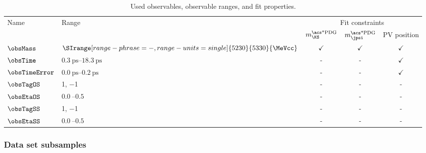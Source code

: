 \begin{table}
\centering
\caption{Used observables, observable ranges, and \DTF fit properties.}
\label{tab:measurement_of_sin2beta:data_preparation:observables}
\begin{tabular}{llccc}
\toprule
Name              & Range           & \multicolumn{3}{c}{Fit constraints} \\ 
                  &                 & $m_{\KS}^{\text{\acs*{PDG}}}$ & $m_{\jpsi}^{\text{\acs*{PDG}}}$ & \acs{PV} position \\
\midrule    
$\obsMass$        & $\SIrange[range-phrase = -, range-units = single]{5230}{5330}{\MeVcc}$      & $\checkmark$ & $\checkmark$ & $\checkmark$ \\
$\obsTime$        & $\SIrange[range-phrase = -, range-units = single]{0.3}{18.3}{\pico\second}$ & -            & -            & $\checkmark$ \\
$\obsTimeError$   & $\SIrange[range-phrase = -, range-units = single]{0.0}{0.2}{\pico\second}$  & -            & -            & $\checkmark$ \\
$\obsTagOS$       & \num[retain-explicit-plus]{+1}, \num{-1} & - & - & - \\
$\obsEtaOS$       & $\SIrange[range-phrase = -]{0.0}{0.5}{}$ & - & - & - \\
$\obsTagSS$       & \num[retain-explicit-plus]{+1}, \num{-1} & - & - & - \\
$\obsEtaSS$       & $\SIrange[range-phrase = -]{0.0}{0.5}{}$ & - & - & - \\
\bottomrule
\end{tabular}
\end{table}

\subsubsection{Data set subsamples}
\label{sec:measurement_of_sin2beta:data_preparation:subsamples}

